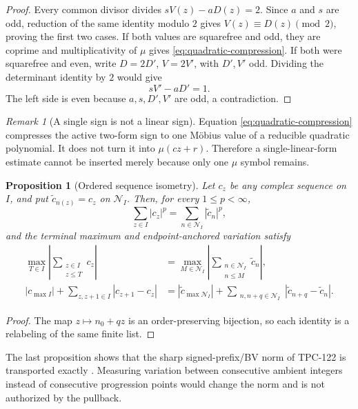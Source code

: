\documentclass[11pt]{article}
\newtheorem{proposition}[theorem]{Proposition}
\theoremstyle{definition}
\theoremstyle{remark}
\newtheorem{remark}[theorem]{Remark}
\begin{document}
\begin{proof}
Every common divisor divides
\(sV(z)-aD(z)=2\).  Since \(a\) and \(s\) are odd, reduction of the
same identity modulo \(2\) gives \(V(z)\equiv D(z)\pmod2\), proving
the first two cases.  If both values are squarefree and odd, they are
coprime and multiplicativity of \(\mu\) gives
\eqref{eq:quadratic-compression}.  If both were squarefree and even,
write \(D=2D'\), \(V=2V'\), with \(D',V'\) odd.  Dividing the
determinant identity by \(2\) would give
\[
 sV'-aD'=1.
\]
The left side is even because \(a,s,D',V'\) are odd, a
contradiction.
\end{proof}

\begin{remark}[A single sign is not a linear sign]
Equation \eqref{eq:quadratic-compression} compresses the active
two-form sign to one M\"obius value of a reducible quadratic
polynomial.  It does not turn it into \(\mu(cz+r)\).  Therefore a
single-linear-form estimate cannot be inserted merely because only
one \(\mu\) symbol remains.
\end{remark}

\begin{proposition}[Ordered sequence isometry]
\label{prop:isometry}
Let \(c_z\) be any complex sequence on \(I\), and put
\(\widetilde c_{n(z)}=c_z\) on \(\mathcal N_I\).  Then, for every
\(1\le p<\infty\),
\[
 \sum_{z\in I}|c_z|^p
 =
 \sum_{n\in\mathcal N_I}|\widetilde c_n|^p,
\]
and the terminal maximum and endpoint-anchored variation satisfy
\begin{align*}
 \max_{T\in I}\left|\sum_{\substack{z\in I\\z\le T}}c_z\right|
 &=
 \max_{M\in\mathcal N_I}
 \left|\sum_{\substack{n\in\mathcal N_I\\n\le M}}
 \widetilde c_n\right|,\\
 |c_{\max I}|+\sum_{z,z+1\in I}|c_{z+1}-c_z|
 &=
 |\widetilde c_{\max\mathcal N_I}|
 +\sum_{\substack{n,n+q\in\mathcal N_I}}
 |\widetilde c_{n+q}-\widetilde c_n|.
\end{align*}
\end{proposition}

\begin{proof}
The map \(z\mapsto n_0+qz\) is an order-preserving bijection, so
each identity is a relabeling of the same finite list.
\end{proof}

The last proposition shows that the sharp signed-prefix/BV norm of
TPC-122 is transported exactly \citep{WangTPC122}.  Measuring
variation between consecutive ambient integers instead of
consecutive progression points would change the norm and is not
authorized by the pullback.
\end{document}
